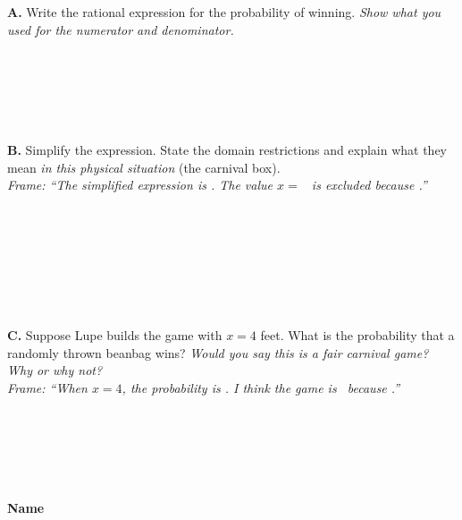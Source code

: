 \documentclass[11pt]{article}
\newcommand{\framedline}[1]{\underline{\hspace{#1}}}
\newcommand{\frameblank}{\underline{\hspace{4em}}}
\newcommand{\writeline}{\rule[-2pt]{0pt}{12pt}}
\begin{document}
\vspace{0.3em}
\textbf{A.}\; Write the rational expression for the probability of winning. \emph{Show what you used for the numerator and denominator.} \\
\writeline \\[8pt]
\writeline \\[8pt]
\writeline \\[8pt]
\writeline

\vspace{0.3em}
\textbf{B.}\; Simplify the expression. State the domain restrictions and explain what they mean \emph{in this physical situation} (the carnival box). \\
{\small\itshape Frame: ``The simplified expression is \frameblank. The value $x = $ \frameblank\ is excluded because \frameblank.''}\\
\writeline \\[8pt]
\writeline \\[8pt]
\writeline \\[8pt]
\writeline \\[8pt]
\writeline

\vspace{0.3em}
\textbf{C.}\; Suppose Lupe builds the game with $x = 4$ feet. What is the probability that a randomly thrown beanbag wins? \emph{Would you say this is a fair carnival game? Why or why not?} \\
{\small\itshape Frame: ``When $x = 4$, the probability is \frameblank. I think the game is \frameblank\ because \frameblank.''}\\
\writeline \\[8pt]
\writeline \\[8pt]
\writeline \\[8pt]
\writeline

\newpage

\textbf{Name} \framedline{4.5in}
\end{document}

